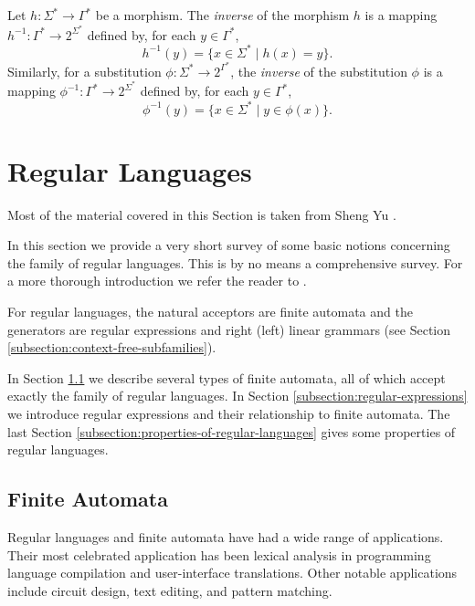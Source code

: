Let $h: \Sigma^* \to \Gamma^*$ be a morphism. The  \emph{inverse} of the morphism $h$ is a mapping $h^{-1}: \Gamma^* \to 2^{\Sigma^*}$ defined by, for each $y \in \Gamma^*$, $$h^{-1}(y) = \{x \in \Sigma^* \mid h(x) = y\}.$$ Similarly, for a substitution $\phi: \Sigma^* \to 2^{\Gamma^*}$, the \emph{inverse} of the substitution $\phi$ is a mapping $\phi^{-1}: \Gamma^* \to 2^{\Sigma^*}$ defined by, for each $y \in \Gamma^*$, $$\phi^{-1}(y) = \{x \in \Sigma^* \mid y \in \phi(x)\}.$$

\section{Regular Languages}
\label{section:regular-languages}

Most of the material covered in this Section is taken from Sheng Yu \cite{Sh1997regular}.

In this section we provide a very short survey of some basic notions concerning the family of regular languages. This is by no means a comprehensive survey. For a more thorough introduction we refer the reader to \cite{HopcroftMotwaniUllman07}.

For  regular languages, the natural acceptors are finite automata and the generators are regular expressions and right (left) linear grammars (see Section \ref{subsection:context-free-subfamilies}).

In Section \ref{subsection:finite-automata} we describe several types of finite automata, all of which accept exactly the family of regular languages. In Section \ref{subsection:regular-expressions} we introduce regular expressions and their relationship to finite automata. The last Section \ref{subsection:properties-of-regular-languages} gives some properties of regular languages.

\subsection{Finite Automata}
\label{subsection:finite-automata}

Regular languages and finite automata have had a wide range of applications. Their most celebrated application has been lexical analysis in programming language compilation and user-interface translations. Other notable applications include circuit design, text editing, and pattern matching.

